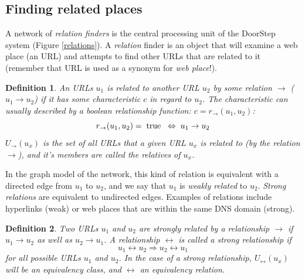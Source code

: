 \documentclass[a4paper]{danarticle}
\newtheorem{definition}{Definition}
\theoremstyle{remark}
\begin{document}
     \subsection{Finding related places} 
       A network of \textit{relation finders} is the central processing unit of 
       the DoorStep system (Figure \ref{relations}). 
       A \textit{relation} finder is an object that will 
       examine a web place (an URL) and attempts to find other URLs that are 
       related to it (remember that URL is used as a synonym for \textit{web
       place}!). 
       \begin{definition}
       An URLs $ u_1 $ is related to another URL $ u_2 $ by some relation 
       $ \rightarrow $
       ($ u_1 \rightarrow u_2 $) if it has some characteristic $ c $ in regard
       to $ u_2 $. The characteristic can usually described by a boolean
       relationship function: $ c = r_{\rightarrow}(u_1, u_2) $:
       \[
         r_{\rightarrow}(u_1, u_2) = \hspace{1mm} \mbox{true} \hspace{2mm} 
	     \Leftrightarrow \hspace{1mm} u_1 \rightarrow u_2
       \]
       $ U_{\rightarrow}(u_x) $ is the set of all URLs that a given URL $ u_x $ 
       is related to (by the relation $ \rightarrow $), and it's members are 
       called the \emph{relatives} of $ u_x $.
       \end{definition}
       In the graph model of the network, this kind of relation is equivalent
       with a directed edge from $ u_1 $ to $ u_2 $, and we say that $ u_1 $ is
       \textit{weakly related} to $ u_2 $. \textit{Strong relations} are
       equivalent to undirected edges.
       Examples of relations include hyperlinks (weak) or web places that are
       within the same DNS domain (strong). 
       \begin{definition}
       Two URLs $ u_1 $ and $ u_2 $ are \emph{strongly related} by a relationship
       $ \rightarrow $ if $ u_1 \rightarrow u_2 $ as well as 
       $ u_2 \rightarrow u_1 $. A relationship $ \leftrightarrow $ is called a
       \emph{strong} relationship if
       \[
         u_1 \leftrightarrow u_2 \Rightarrow u_2 \leftrightarrow u_1 
       \]
       for all possible URLs $ u_1 $ and $ u_2 $. In the case of a strong 
       relationship, $ U_{\leftrightarrow}(u_x) $ will be an equivalency 
       class, and $ \leftrightarrow $ an equivalency relation.
       \end{definition}
\end{document}
